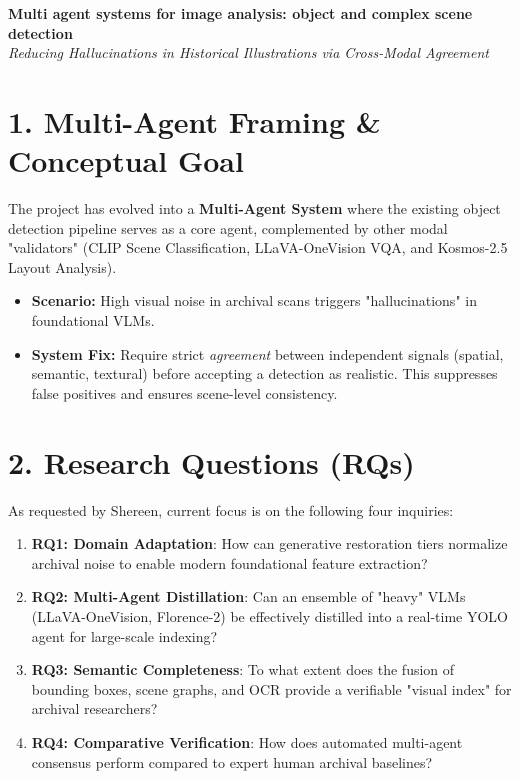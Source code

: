 \documentclass[11pt,a4paper]{article}
\begin{document}
\begin{center}
    {\large \textbf{Multi agent systems for image analysis: object and complex scene detection}} \\
    \vspace{0.1cm}
    \textit{Reducing Hallucinations in Historical Illustrations via Cross-Modal Agreement}
\end{center}

\vspace{0.3cm}

\section*{1. Multi-Agent Framing \& Conceptual Goal}
The project has evolved into a \textbf{Multi-Agent System} where the existing object detection pipeline serves as a core agent, complemented by other modal "validators" (CLIP Scene Classification, LLaVA-OneVision VQA, and Kosmos-2.5 Layout Analysis).
\begin{itemize}[noitemsep]
    \item \textbf{Scenario:} High visual noise in archival scans triggers "hallucinations" in foundational VLMs.
    \item \textbf{System Fix:} Require strict \textit{agreement} between independent signals (spatial, semantic, textural) before accepting a detection as realistic. This suppresses false positives and ensures scene-level consistency.
\end{itemize}

\section*{2. Research Questions (RQs)}
As requested by Shereen, current focus is on the following four inquiries:
\begin{enumerate}[noitemsep]
    \item \textbf{RQ1: Domain Adaptation}: How can generative restoration tiers normalize archival noise to enable modern foundational feature extraction?
    \item \textbf{RQ2: Multi-Agent Distillation}: Can an ensemble of "heavy" VLMs (LLaVA-OneVision, Florence-2) be effectively distilled into a real-time YOLO agent for large-scale indexing?
    \item \textbf{RQ3: Semantic Completeness}: To what extent does the fusion of bounding boxes, scene graphs, and OCR provide a verifiable "visual index" for archival researchers?
    \item \textbf{RQ4: Comparative Verification}: How does automated multi-agent consensus perform compared to expert human archival baselines?
\end{enumerate}
\end{document}
